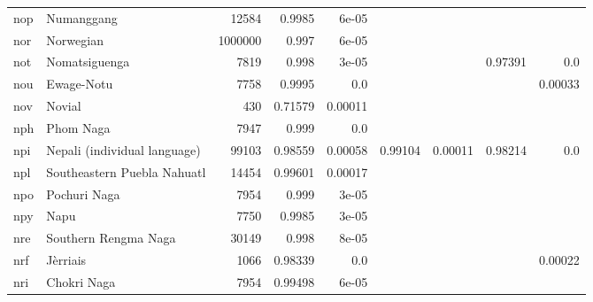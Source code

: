 \documentclass[11pt]{article}
\begin{document}
\begin{table*}[h]
{\begin{tabular}{llrrrrrrr}
nop         & Numanggang         & 12584         & 0.9985         & 6e-05         &          &          &          &          \\

nor         & Norwegian         & 1000000         & 0.997         & 6e-05         &          &          &          &          \\

not         & Nomatsiguenga         & 7819         & 0.998         & 3e-05         &          &          & 0.97391         & 0.0         \\

nou         & Ewage-Notu         & 7758         & 0.9995         & 0.0         &          &          &          & 0.00033         \\

nov         & Novial         & 430         & 0.71579         & 0.00011         &          &          &          &          \\

nph         & Phom Naga         & 7947         & 0.999         & 0.0         &          &          &          &          \\

npi         & Nepali (individual language)         & 99103         & 0.98559         & 0.00058         & 0.99104         & 0.00011         & 0.98214         & 0.0         \\

npl         & Southeastern Puebla Nahuatl         & 14454         & 0.99601         & 0.00017         &          &          &          &          \\

npo         & Pochuri Naga         & 7954         & 0.999         & 3e-05         &          &          &          &          \\

npy         & Napu         & 7750         & 0.9985         & 3e-05         &          &          &          &          \\

nre         & Southern Rengma Naga         & 30149         & 0.998         & 8e-05         &          &          &          &          \\

nrf         & Jèrriais         & 1066         & 0.98339         & 0.0         &          &          &          & 0.00022         \\

nri         & Chokri Naga         & 7954         & 0.99498         & 6e-05         &          &          &          &          \\


\end{tabular}}
\end{table*}
\end{document}
